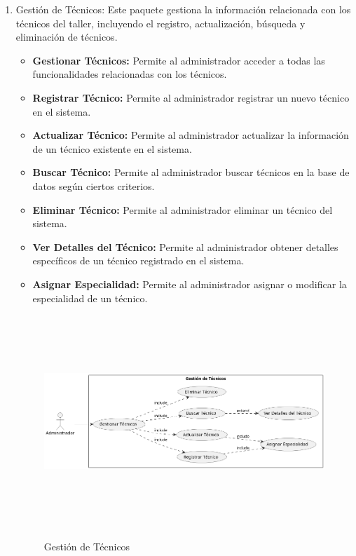 \begin{enumerate}
	\item Gestión de Técnicos:
	Este paquete gestiona la información relacionada con los técnicos del taller, incluyendo el registro, actualización, búsqueda y eliminación de técnicos.
	\begin{itemize}
		\item \textbf{Gestionar Técnicos:} Permite al administrador acceder a todas las funcionalidades relacionadas con los técnicos.
		\item \textbf{Registrar Técnico:} Permite al administrador registrar un nuevo técnico en el sistema.
		\item \textbf{Actualizar Técnico:} Permite al administrador actualizar la información de un técnico existente en el sistema.
		\item \textbf{Buscar Técnico:} Permite al administrador buscar técnicos en la base de datos según ciertos criterios.
		\item \textbf{Eliminar Técnico:} Permite al administrador eliminar un técnico del sistema.
		\item \textbf{Ver Detalles del Técnico:} Permite al administrador obtener detalles específicos de un técnico registrado en el sistema.
		\item \textbf{Asignar Especialidad:} Permite al administrador asignar o modificar la especialidad de un técnico.
	\end{itemize}  
	\begin{figure}[H]
		\centering
		\caption{Gestión de Técnicos}
		\includegraphics[width=12cm, height=8cm]{imagenes/cap4/casosUso/GestionTecnicos.png}
		\label{fig:Caso5}
	\end{figure}   
	

\end{enumerate}
